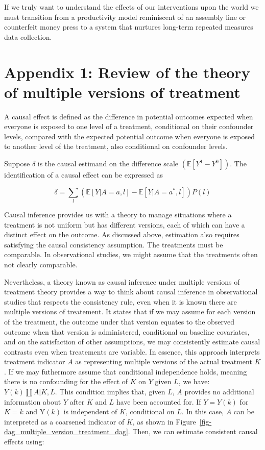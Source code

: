 \documentclass[
  singlecolumn]{report}
\begin{document}
If we truly want to understand the effects of our interventions upon the
world we must transition from a productivity model reminiscent of an
assembly line or counterfeit money press to a system that nurtures
long-term repeated measures data collection.

\newpage{}

\hypertarget{appendix-1-review-of-the-theory-of-multiple-versions-of-treatment}{%
\section{Appendix 1: Review of the theory of multiple versions of
treatment}\label{appendix-1-review-of-the-theory-of-multiple-versions-of-treatment}}

A causal effect is defined as the difference in potential outcomes
expected when everyone is exposed to one level of a treatment,
conditional on their confounder levels, compared with the expected
potential outcome when everyone is exposed to another level of the
treatment, also conditional on confounder levels.

Suppose \(\delta\) is the causal estimand on the difference scale
\((\mathbb{E}[Y^1 - Y^0])\). The identification of a causal effect can
be expressed as

\[ \delta = \sum_l \left( \mathbb{E}[Y|A=a,l] - \mathbb{E}[Y|A=a^*,l] \right) P(l)\]

Causal inference provides us with a theory to manage situations where a
treatment is not uniform but has different versions, each of which can
have a distinct effect on the outcome. As discussed above, estimation
also requires satisfying the causal consistency assumption. The
treatments must be comparable. In observational studies, we might assume
that the treatments often not clearly comparable.

Nevertheless, a theory known as causal inference under multiple versions
of treatment theory provides a way to think about causal inference in
observational studies that respects the consistency rule, even when it
is known there are multiple versions of treatement. It states that if we
may assume for each version of the treatment, the outcome under that
version equates to the observed outcome when that version is
administered, conditional on baseline covariates, and on the
satisfaction of other assumptions, we may consistently estimate causal
contrasts even when treatements are variable. In essence, this approach
interprets treatment indicator \(A\) as representing multiple versions
of the actual treatment \(K\). If we may futhermore assume that
conditional independence holds, meaning there is no confounding for the
effect of \(K\) on \(Y\) given \(L\), we have: \(Y(k)\coprod A|K,L\).
This condition implies that, given \(L\), \(A\) provides no additional
information about \(Y\) after \(K\) and \(L\) have been accounted for.
If \(Y = Y(k)\) for \(K = k\) and Y\((k)\) is independent of \(K\),
conditional on \(L\). In this case, \(A\) can be interpreted as a
coarsened indicator of \(K\), as shown in
Figure~\ref{fig-dag_multiple_version_treatment_dag}. Then, we can
estimate consistent causal effects using:
\end{document}
